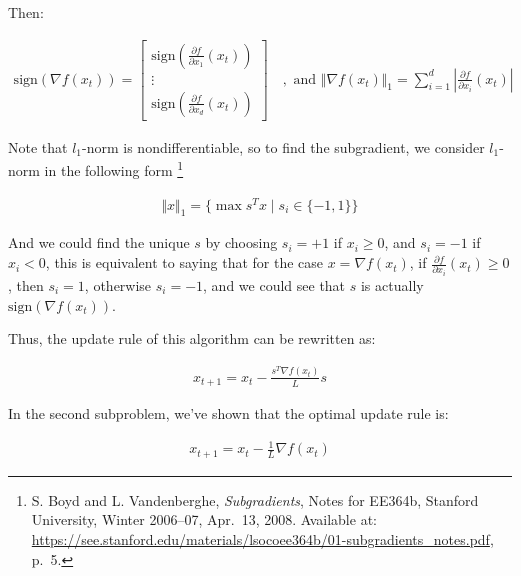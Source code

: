 \documentclass{article}
\begin{document}
Then:

\begin{align*}
    \mathrm{sign}(\nabla f(x_t)) = 
    \begin{bmatrix}
        \mathrm{sign}(\frac{\partial f}{\partial x_1}(x_t)) \\
        \vdots \\
        \mathrm{sign}(\frac{\partial f}{\partial x_d}(x_t))
    \end{bmatrix}
    \quad, \text{ and }
    \Vert \nabla f(x_t) \Vert_1 = \sum_{i=1}^{d} \left| \frac{\partial f}{\partial x_i}(x_t) \right|
\end{align*}

Note that $l_1$-norm is nondifferentiable, so to find the subgradient, we consider $l_1$-norm in the following form
\footnote{S. Boyd and L. Vandenberghe, \textit{Subgradients}, Notes for EE364b, Stanford University, Winter 2006--07, Apr.~13, 2008. Available at: \url{https://see.stanford.edu/materials/lsocoee364b/01-subgradients_notes.pdf}, p.~5.}

\begin{align*}
    \Vert x \Vert_1 = \{ \max s^Tx \mid s_i \in \{ -1, 1 \} \} 
\end{align*}

And we could find the unique $s$ by choosing $s_i = +1$ if $x_i \geq 0$, and $s_i = -1$ if $x_i < 0$,
this is equivalent to saying that for the case $x = \nabla f(x_t)$, if $\frac{\partial f}{\partial x_i}(x_t) \geq 0$, then $s_i = 1$, otherwise $s_i = -1$,
and we could see that $s$ is actually $\mathrm{sign}(\nabla f(x_t))$.
\bigskip

Thus, the update rule of this algorithm can be rewritten as:

\begin{align*}
    x_{t+1} = x_t - \frac{s^T \nabla f(x_t)}{L} s
\end{align*}

In the second subproblem, we've shown that the optimal update rule is:

\begin{align*}
    x_{t+1} = x_t - \frac{1}{L} \nabla f(x_t)
\end{align*}
\end{document}
